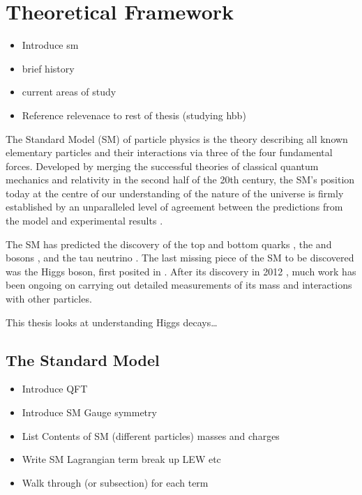 \chapter{Theoretical Framework}\label{chap:theory}

\begin{itemize}
  \item Introduce sm
  \item brief history
  \item current areas of study
  \item Reference relevenace to rest of thesis (studying hbb)
\end{itemize}

The Standard Model (SM) of particle physics is the theory describing all known elementary particles and their interactions via three of the four fundamental forces.
Developed by merging the successful theories of classical quantum mechanics and relativity in the second half of the 20th century, the SM's position today at the centre of our understanding of the nature of the universe is firmly established by an unparalleled level of agreement between the predictions from the model and experimental results \cite{morel2020determination,sailer2022measurement}.

The SM has predicted the discovery of the top and bottom quarks \cite{CDF:1995wbb,D0:1995jca,Herb:1977ek}, the \Wboson and \Zboson bosons \cite{UA1:1983crd}, and the tau neutrino \cite{DONUT:2000fbd}.
The last missing piece of the SM to be discovered was the Higgs boson, first posited in .
After its discovery in 2012 , much work has been ongoing on carrying out detailed measurements of its mass and interactions with other particles.

This thesis looks at understanding Higgs decays\dots


\section{The Standard Model}\label{sec:standard_model}

\begin{itemize}
  \item Introduce QFT
  \item Introduce SM Gauge symmetry
  \item List Contents of SM (different particles) masses and charges
  \item Write SM Lagrangian term break up LEW etc
  \item Walk through (or subsection) for each term
\end{itemize}

